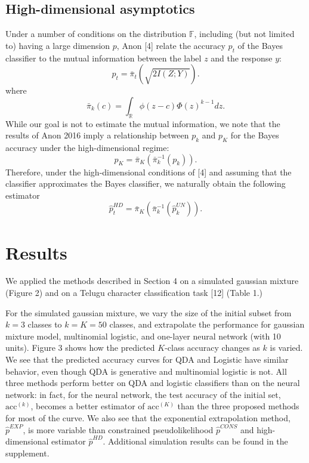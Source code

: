 \documentclass{article}
\begin{document}
\subsection{High-dimensional asymptotics}

Under a number of conditions on the distribution $\mathbb{F}$, including (but not limited to) having a large dimension $p$,
Anon [4] relate the accuracy $p_t$ of the Bayes classifier to the mutual information between the label $z$ and
the response $y$:
\[
p_t = \bar{\pi}_t(\sqrt{2I(Z; Y)}).
\]
where
\[
\bar{\pi}_k(c) = \int_{\mathbb{R}} \phi(z - c)  \Phi(z)^{k-1} dz.
\]
While our goal is not to estimate the mutual information, we note that the results of Anon 2016
imply a relationship between $p_k$ and $p_K$ for the Bayes accuracy under the high-dimensional regime:
\[
p_K = \bar{\pi}_K\left(\bar{\pi}_k^{-1}(p_k)\right).
\]
Therefore, under the high-dimensional conditions of [4] and assuming that the classifier approximates
the Bayes classifier, we naturally obtain the following estimator
\[
\hat{p}_t^{HD} = \bar{\pi}_K\left(\bar{\pi}_k^{-1}(\hat{p}_k^{UN})\right).
\]

\section{Results}

We applied the methods described in Section 4 on a simulated gaussian mixture (Figure 2)
and on a Telugu character classification task [12] (Table 1.)

For the simulated gaussian mixture, we vary the size of the initial subset from $k=3$ classes to $k=K=50$ classes,
and extrapolate the performance for gaussian mixture model, multinomial logistic, and one-layer neural network (with 10 units).
Figure 3 shows how the predicted $K$-class accuracy changes as $k$ is varied.
We see that the predicted accuracy curves for QDA and Logistic have similar behavior,
even though QDA is generative and multinomial logistic is not.  All three methods perform better on QDA and logistic classifiers
than on the neural network: in fact, for the neural network, the test accuracy of the initial set, $\text{acc}^{(k)}$,
becomes a better estimator of $\text{acc}^{(K)}$ than the three proposed methods for most of the curve.
We also see that the exponential extrapolation method, $\hat{p}^{EXP}$,
is more variable than constrained pseudolikelihood $\hat{p}^{CONS}$ and high-dimensional estimator $\hat{p}^{HD}$.
Additional simulation results can be found in the supplement.
\end{document}
